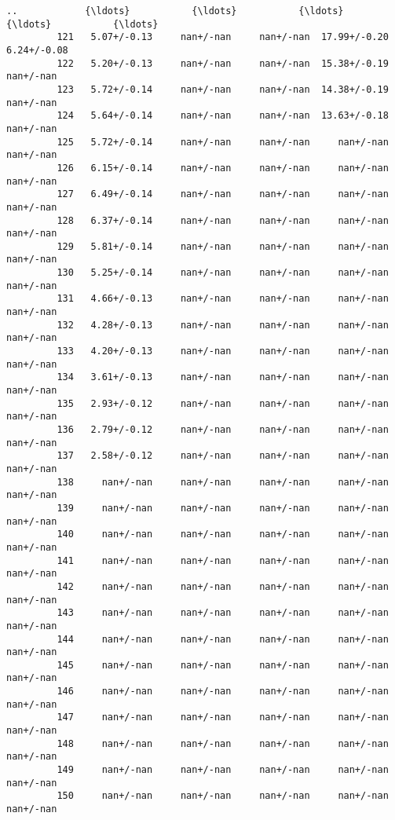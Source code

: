 \documentclass[11pt]{article}
\begin{document}
\begin{Verbatim}[commandchars=\\\{\}]
         ..            {\ldots}           {\ldots}           {\ldots}           {\ldots}           {\ldots}   
         121   5.07+/-0.13     nan+/-nan     nan+/-nan  17.99+/-0.20   6.24+/-0.08   
         122   5.20+/-0.13     nan+/-nan     nan+/-nan  15.38+/-0.19     nan+/-nan   
         123   5.72+/-0.14     nan+/-nan     nan+/-nan  14.38+/-0.19     nan+/-nan   
         124   5.64+/-0.14     nan+/-nan     nan+/-nan  13.63+/-0.18     nan+/-nan   
         125   5.72+/-0.14     nan+/-nan     nan+/-nan     nan+/-nan     nan+/-nan   
         126   6.15+/-0.14     nan+/-nan     nan+/-nan     nan+/-nan     nan+/-nan   
         127   6.49+/-0.14     nan+/-nan     nan+/-nan     nan+/-nan     nan+/-nan   
         128   6.37+/-0.14     nan+/-nan     nan+/-nan     nan+/-nan     nan+/-nan   
         129   5.81+/-0.14     nan+/-nan     nan+/-nan     nan+/-nan     nan+/-nan   
         130   5.25+/-0.14     nan+/-nan     nan+/-nan     nan+/-nan     nan+/-nan   
         131   4.66+/-0.13     nan+/-nan     nan+/-nan     nan+/-nan     nan+/-nan   
         132   4.28+/-0.13     nan+/-nan     nan+/-nan     nan+/-nan     nan+/-nan   
         133   4.20+/-0.13     nan+/-nan     nan+/-nan     nan+/-nan     nan+/-nan   
         134   3.61+/-0.13     nan+/-nan     nan+/-nan     nan+/-nan     nan+/-nan   
         135   2.93+/-0.12     nan+/-nan     nan+/-nan     nan+/-nan     nan+/-nan   
         136   2.79+/-0.12     nan+/-nan     nan+/-nan     nan+/-nan     nan+/-nan   
         137   2.58+/-0.12     nan+/-nan     nan+/-nan     nan+/-nan     nan+/-nan   
         138     nan+/-nan     nan+/-nan     nan+/-nan     nan+/-nan     nan+/-nan   
         139     nan+/-nan     nan+/-nan     nan+/-nan     nan+/-nan     nan+/-nan   
         140     nan+/-nan     nan+/-nan     nan+/-nan     nan+/-nan     nan+/-nan   
         141     nan+/-nan     nan+/-nan     nan+/-nan     nan+/-nan     nan+/-nan   
         142     nan+/-nan     nan+/-nan     nan+/-nan     nan+/-nan     nan+/-nan   
         143     nan+/-nan     nan+/-nan     nan+/-nan     nan+/-nan     nan+/-nan   
         144     nan+/-nan     nan+/-nan     nan+/-nan     nan+/-nan     nan+/-nan   
         145     nan+/-nan     nan+/-nan     nan+/-nan     nan+/-nan     nan+/-nan   
         146     nan+/-nan     nan+/-nan     nan+/-nan     nan+/-nan     nan+/-nan   
         147     nan+/-nan     nan+/-nan     nan+/-nan     nan+/-nan     nan+/-nan   
         148     nan+/-nan     nan+/-nan     nan+/-nan     nan+/-nan     nan+/-nan   
         149     nan+/-nan     nan+/-nan     nan+/-nan     nan+/-nan     nan+/-nan   
         150     nan+/-nan     nan+/-nan     nan+/-nan     nan+/-nan     nan+/-nan   
         

\end{Verbatim}
\end{document}
